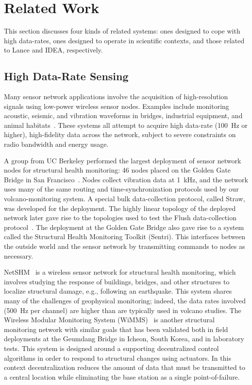 \section{Related Work}
\label{sec-relatedwork}

This section discusses four kinds of related systems: ones designed to cope
with high data-rates, ones designed to operate in scientific contexts, and
those related to Lance and IDEA, respectively.

\subsection{High Data-Rate Sensing}

Many sensor network applications involve the acquisition of high-resolution
signals using low-power wireless sensor nodes. Examples include monitoring
acoustic, seismic, and vibration waveforms in bridges, industrial equipment,
and animal habitats~\cite{girod-ipsn07,enviromic}. These systems all attempt
to acquire high data-rate (100~Hz or higher), high-fidelity data across the
network, subject to severe constraints on radio bandwidth and energy usage.

A group from UC Berkeley performed the largest deployment of sensor network
nodes for structural health monitoring: 46 nodes placed on the Golden Gate
Bridge in San Francisco~\cite{ggb-ipsn07}. Nodes collect vibration data at
1~kHz, and the network uses many of the same routing and time-synchronization
protocols used by our volcano-monitoring system. A special bulk
data-collection protocol, called Straw, was developed for the deployment. The
highly linear topology of the deployed network later gave rise to the
topologies used to test the Flush data-collection
protocol~\cite{flush-sensys07}. The deployment at the Golden Gate Bridge also
gave rise to a system called the Structural Health Monitoring Toolkit
(Sentri). This interfaces between the outside world and the sensor network by
transmitting commands to nodes as necessary.

NetSHM~\cite{netshm-ewsnsubmission,netshm-emnets05,wisan} is a wireless
sensor network for structural health monitoring, which involves studying the
response of buildings, bridges, and other structures to localize structural
damage, e.g., following an earthquake. This system shares many of the
challenges of geophysical monitoring; indeed, the data rates involved (500~Hz
per channel) are higher than are typically used in volcano studies. The
Wireless Modular Monitoring System (WiMMS)~\cite{wimms-lynch06} is another
structural monitoring network with similar goals that has been validated both
in field deployments at the Geumdang Bridge in Icheon, South Korea, and in
laboratory tests. This system is designed around a supporting decentralized
control algorithms in order to respond to structural changes using actuators.
In this context decentralization reduces the amount of data that must be
transmitted to a central location while eliminating the base station as a
single point-of-failure.


